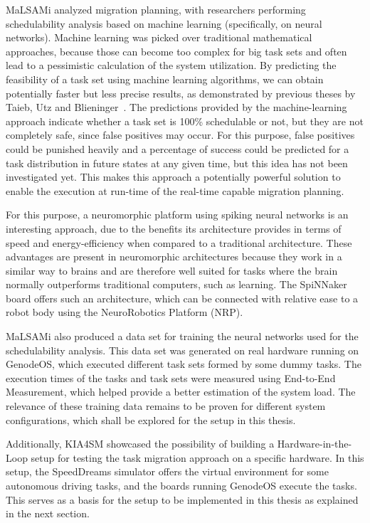MaLSAMi analyzed migration planning, with researchers performing schedulability analysis based on machine learning (specifically, on neural networks). Machine learning was picked over traditional mathematical approaches, because those can become too complex for big task sets and often lead to a pessimistic calculation of the system utilization. By predicting the feasibility of a task set using machine learning algorithms, we can obtain potentially faster but less precise results, as demonstrated by previous theses by Taieb, Utz and Blieninger~\parencite{taieb1, utz1, blieninger1}. The predictions provided by the machine-learning approach indicate whether a task set is 100\% schedulable or not, but they are not completely safe, since false positives may occur. For this purpose, false positives could be punished heavily and a percentage of success could be predicted for a task distribution in future states at any given time, but this idea has not been investigated yet. This makes this approach a potentially powerful solution to enable the execution at run-time of the real-time capable migration planning.

For this purpose, a neuromorphic platform using spiking neural networks is an interesting approach, due to the benefits its architecture provides in terms of speed and energy-efficiency when compared to a traditional architecture. These advantages are present in neuromorphic architectures because they work in a similar way to brains and are therefore well suited for tasks where the brain normally outperforms traditional computers, such as learning. The SpiNNaker board offers such an architecture, which can be connected with relative ease to a robot body using the NeuroRobotics Platform (NRP).

MaLSAMi also produced a data set for training the neural networks used for the schedulability analysis. This data set was generated on real hardware running on GenodeOS, which executed different task sets formed by some dummy tasks. The execution times of the tasks and task sets were measured using End-to-End Measurement, which helped provide a better estimation of the system load. The relevance of these training data remains to be proven for different system configurations, which shall be explored for the setup in this thesis.

Additionally, KIA4SM showcased the possibility of building a Hardware-in-the-Loop setup for testing the task migration approach on a specific hardware. In this setup, the SpeedDreams simulator offers the virtual environment for some autonomous driving tasks, and the boards running GenodeOS execute the tasks. This serves as a basis for the setup to be implemented in this thesis as explained in the next section.

